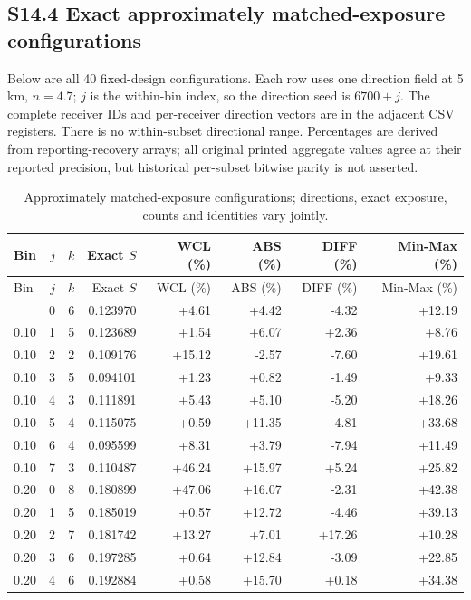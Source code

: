 \documentclass[journal,onecolumn,10pt]{IEEEtran}
\begin{document}
\subsection*{S14.4 Exact approximately matched-exposure configurations}
Below are all 40 fixed-design configurations. Each row uses one direction field at 5 km, $n=4.7$; $j$ is the within-bin index, so the direction seed is $6700+j$. The complete receiver IDs and per-receiver direction vectors are in the adjacent CSV registers. There is no within-subset directional range. Percentages are derived from reporting-recovery arrays; all original printed aggregate values agree at their reported precision, but historical per-subset bitwise parity is not asserted.
\begingroup\small
\begin{longtable}{@{}lrrrrrrr@{}}
\caption{Approximately matched-exposure configurations; directions, exact exposure, counts and identities vary jointly.}\label{tab:s-matched40}\\
\toprule
Bin & $j$ & $k$ & Exact $S$ & WCL (\%) & ABS (\%) & DIFF (\%) & Min-Max (\%) \\
\midrule\endfirsthead
\toprule
Bin & $j$ & $k$ & Exact $S$ & WCL (\%) & ABS (\%) & DIFF (\%) & Min-Max (\%) \\
\midrule\endhead
\bottomrule\endfoot
0.10 & 0 & 6 & 0.123970 & +4.61 & +4.42 & -4.32 & +12.19 \\
0.10 & 1 & 5 & 0.123689 & +1.54 & +6.07 & +2.36 & +8.76 \\
0.10 & 2 & 2 & 0.109176 & +15.12 & -2.57 & -7.60 & +19.61 \\
0.10 & 3 & 5 & 0.094101 & +1.23 & +0.82 & -1.49 & +9.33 \\
0.10 & 4 & 3 & 0.111891 & +5.43 & +5.10 & -5.20 & +18.26 \\
0.10 & 5 & 4 & 0.115075 & +0.59 & +11.35 & -4.81 & +33.68 \\
0.10 & 6 & 4 & 0.095599 & +8.31 & +3.79 & -7.94 & +11.49 \\
0.10 & 7 & 3 & 0.110487 & +46.24 & +15.97 & +5.24 & +25.82 \\
0.20 & 0 & 8 & 0.180899 & +47.06 & +16.07 & -2.31 & +42.38 \\
0.20 & 1 & 5 & 0.185019 & +0.57 & +12.72 & -4.46 & +39.13 \\
0.20 & 2 & 7 & 0.181742 & +13.27 & +7.01 & +17.26 & +10.28 \\
0.20 & 3 & 6 & 0.197285 & +0.64 & +12.84 & -3.09 & +22.85 \\
0.20 & 4 & 6 & 0.192884 & +0.58 & +15.70 & +0.18 & +34.38 \\

\end{longtable}
\end{document}
